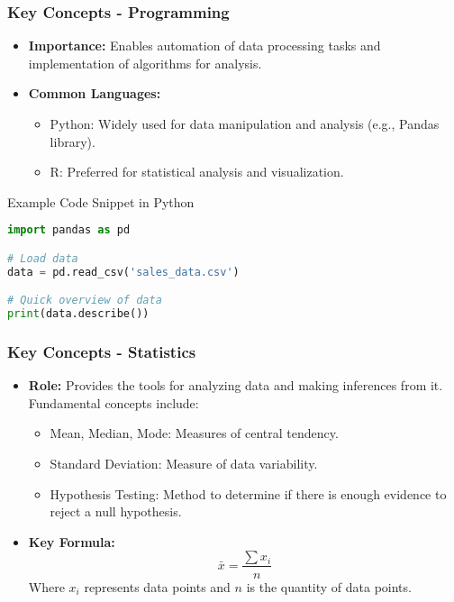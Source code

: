 \documentclass[aspectratio=169]{beamer}
\begin{document}
\begin{frame}[fragile]
    \frametitle{Key Concepts - Programming}
    \begin{itemize}
        \item \textbf{Importance:} Enables automation of data processing tasks and implementation of algorithms for analysis.
        \item \textbf{Common Languages:}
        \begin{itemize}
            \item Python: Widely used for data manipulation and analysis (e.g., Pandas library).
            \item R: Preferred for statistical analysis and visualization.
        \end{itemize}
    \end{itemize}
    \begin{block}{Example Code Snippet in Python}
    \begin{lstlisting}[language=Python]
import pandas as pd

# Load data
data = pd.read_csv('sales_data.csv')

# Quick overview of data
print(data.describe())
    \end{lstlisting}
    \end{block}
\end{frame}

\begin{frame}[fragile]
    \frametitle{Key Concepts - Statistics}
    \begin{itemize}
        \item \textbf{Role:} Provides the tools for analyzing data and making inferences from it. 
        Fundamental concepts include:
        \begin{itemize}
            \item Mean, Median, Mode: Measures of central tendency.
            \item Standard Deviation: Measure of data variability.
            \item Hypothesis Testing: Method to determine if there is enough evidence to reject a null hypothesis.
        \end{itemize}
        \item \textbf{Key Formula:}
        \begin{equation}
            \bar{x} = \frac{\sum{x_i}}{n}
        \end{equation}
        Where \( x_i \) represents data points and \( n \) is the quantity of data points.
    \end{itemize}
\end{frame}
\end{document}
